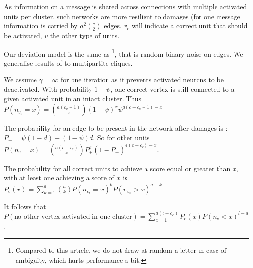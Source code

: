 \documentclass[english,11pt,twocolumn]{IEEEtran}
\renewcommand{\ge}{\geqslant}
\theoremstyle{definition}
\begin{document}
	As information on a message is shared across connections with multiple activated units per cluster, such networks are more resilient to damages (for one message information is carried by $a^2 {c \choose 2}$ edges. $v_c$ will indicate a correct unit that should be activated, $v$ the other type of units.
	
	Our deviation model is the same as \cite{LedGriRabGro20145}\footnote{Compared to this article, we do not draw at random a letter in case of ambiguity, which hurts performance a bit.}, that is random binary noise on edges. We generalise results of \cite{LedGriRabGro20145} to multipartite cliques.
	
	We assume $\gamma = \infty$ for one iteration as it prevents activated neurons to be deactivated.
	With probability $1 - \psi$, one correct vertex is still connected to a given activated unit in an intact cluster. Thus $P(n_{v_c} = x ) = {a (c_k-1) \choose x} (1-\psi)^{x} \psi ^ { a (c - c_e -1) - x }$	
	
	
	The probability for an edge to be present in the network after damages is : $P_+ = \psi (1 - d) + (1 - \psi) d$. So for other units $P(n_v = x) = {a (c - c_e) \choose x} P_+^x (1-P_+)^{a (c - c_e) -x }$.
	
%	
	
	
	The probability for all correct units to achieve a score equal or greater than $x$, with at least one achieving a score of $x$ is $P_c (x) =\sum_{k = 1}^{a} { a \choose k }   P(n_{v_c} = x)^k P(n_{v_c} > x)^{a-k} $

	It follows that $P(\mbox{no other vertex activated in one cluster})= \sum_{x = 1}^{a (c - c_e)} P_c(x) P(n_v < x)^{l-a}$.%
	
\end{document}
